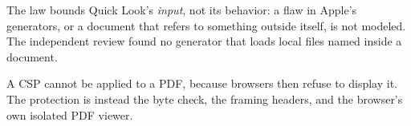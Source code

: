 \begin{boundary}
The law bounds Quick Look's \emph{input}, not its behavior: a flaw in Apple's
generators, or a document that refers to something outside itself, is not
modeled.  The independent review found no generator that loads local files named
inside a document.
\end{boundary}

\begin{boundary}
A CSP  cannot be applied to a PDF, because browsers then refuse to
display it.  The protection is instead the byte check, the framing headers, and
the browser's own isolated PDF viewer.
\end{boundary}
